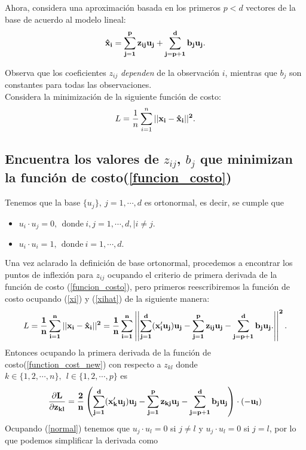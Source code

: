 \documentclass[paper=letter, fontsize=11pt]{scrartcl}
\numberwithin{equation}{section} %
\numberwithin{figure}{section} %
\numberwithin{table}{section} %
\begin{document}
Ahora, considera una aproximación basada en los primeros $p<d$ vectores de la base de acuerdo al modelo lineal: 
\begin{align}\label{xihat}
\bf \hat{x}_i=\sum_{j=1}^p z_{ij}u_j+\sum_{j=p+1}^d b_j u_j.
\end{align}

Observa que los coeficientes $z_{ij}$ \textit{dependen} de la observación $i$, mientras que $b_j$ son constantes para todas las observaciones.\\
Considera la minimización de la siguiente función de costo:
\begin{align}\label{funcion_costo}
L=\frac{1}{n} \sum_{i=1}^n \bf ||x_i-\hat{x}_i||^2.
\end{align}

\subsection{Encuentra los valores de $z_{ij}$, $b_j$ que minimizan la función de costo(\ref{funcion_costo})}
Tenemos que la base $\{u_j\}, \ j = 1,\cdots , d$ es ortonormal, es decir, se cumple que
\begin{itemize} \label{normal}
    \item $u_i \cdot u_j=0, \ \ \text{donde} \ i,j= 1,\cdots , d,| i\neq j.$
    \item $u_i \cdot u_i=1, \ \ \text{donde} \ i= 1,\cdots , d.$
\end{itemize}
Una vez aclarado la definición de base ortonormal, procedemos a encontrar los puntos de inflexión para $z_{ij}$ ocupando el criterio de primera derivada de la función de costo (\ref{funcion_costo}), pero primeros reescribiremos la función de costo ocupando (\ref{xi}) y (\ref{xihat}) de la siguiente manera:
\begin{align}\label{function_cost_new}
    L=\bf \frac{1}{n} \sum_{i=1}^n  ||x_i-\hat{x}_i||^2=\frac{1}{n} \sum_{i=1}^n \left| \left|\sum_{j=1}^d (x_i'u_j)u_j-\sum_{j=1}^p z_{ij}u_j-\sum_{j=p+1}^d b_j u_j. \right| \right|^2.
\end{align}
Entonces ocupando la primera derivada de la función de costo(\ref{function_cost_new}) con respecto a $z_{kl}$ donde $k\in \{1,2, \cdots,n\}, \ \ l\in \{1,2, \cdots, p\}$ es
\begin{align*}
    \bf \frac{\partial L}{\partial z_{kl}} = \frac{2}{n}\left( \sum_{j=1}^d (x_k'u_j)u_j-\sum_{j=1}^p z_{kj}u_j-\sum_{j=p+1}^d b_j u_j \right) \cdot \left(-u_l\right) 
\end{align*}
Ocupando (\ref{normal}) tenemos que $u_j \cdot u_l=0$ si $j\neq l$ y $u_j \cdot u_l=0$ si $j=l$, por lo que podemos simplificar la derivada como
\end{document}
